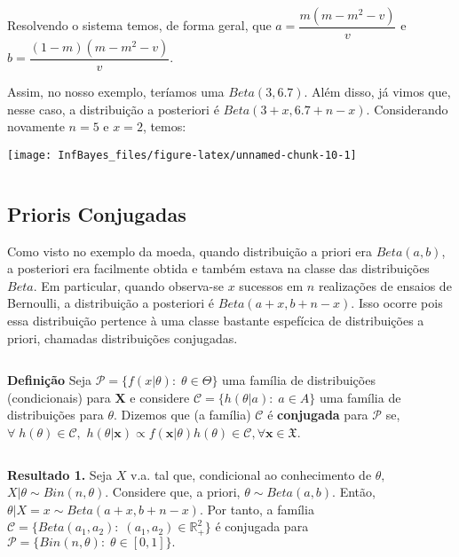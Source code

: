 \documentclass[
]{book}
\begin{document}
Resolvendo o sistema temos, de forma geral, que \(a=\dfrac{m(m-m^2-v)}{v}\) e \(b=\dfrac{(1-m)(m-m^2-v)}{v}\).

Assim, no nosso exemplo, teríamos uma \(Beta(3,6.7)\). Além disso, já vimos que, nesse caso, a distribuição a posteriori é \(Beta(3+x,6.7+n-x)\). Considerando novamente \(n=5\) e \(x=2\), temos:

\begin{center}\texttt{[image: InfBayes\_files/figure-latex/unnamed-chunk-10-1]} \end{center}

\(~\)

\hypertarget{prioris-conjugadas}{%
\subsection{Prioris Conjugadas}\label{prioris-conjugadas}}

Como visto no exemplo da moeda, quando distribuição a priori era \(Beta(a,b)\), a posteriori era facilmente obtida e também estava na classe das distribuições \(Beta\). Em particular, quando observa-se \(x\) sucessos em \(n\) realizações de ensaios de Bernoulli, a distribuição a posteriori é \(Beta(a+x,b+n-x)\). Isso ocorre pois essa distribuição pertence à uma classe bastante espefícica de distribuições a priori, chamadas distribuições conjugadas.

\(~\)

\textbf{Definição} Seja \(\mathcal{P}=\{f(x|\theta):\;\theta \in \Theta\}\) uma família de distribuições (condicionais) para \(\boldsymbol{X}\) e considere \(\mathcal{C}=\{h(\theta|a):\;a\in A\}\) uma família de distribuições para \(\theta\). Dizemos que (a família) \(\mathcal{C}\) é \textbf{conjugada} para \(\mathcal{P}\) se, \(\forall \;h(\theta)\in \mathcal{C},\) \(h(\theta|\boldsymbol{x})\propto f(\boldsymbol x|\theta)h(\theta) \in \mathcal{C},\forall \boldsymbol x \in \mathfrak{X}.\)

\(~\)

\textbf{Resultado 1.} Seja \(X\) v.a. tal que, condicional ao conhecimento de \(\theta,\) \(X|\theta \sim Bin(n,\theta).\) Considere que, a priori, \(\theta \sim Beta(a,b).\) Então, \(\theta|X=x \sim Beta(a+x,b+n-x).\) Por tanto, a família \(\mathcal{C}=\{Beta(a_1,a_2):\;(a_1,a_2)\in \mathbb{R}^2_+\}\) é conjugada para \(\mathcal{P}=\{Bin(n,\theta):\;\theta \in [0,1]\}.\)

\(~\)
\end{document}
